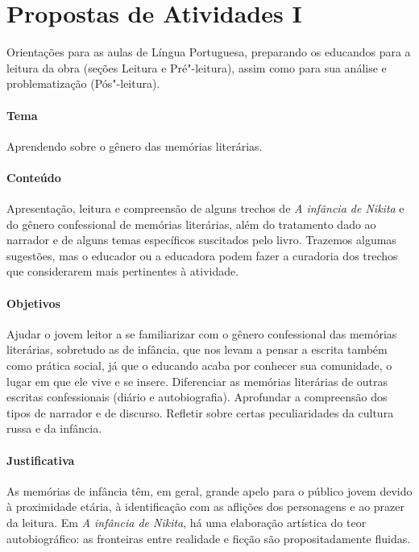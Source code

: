 \documentclass[11pt]{extarticle}
\begin{document}
\tableofcontents

\section{Propostas de Atividades I}

Orientações para as aulas de Língua Portuguesa, preparando os
educandos para a leitura da obra (seções Leitura e Pré"-leitura), assim como para
sua análise e problematização (Pós"-leitura).

\paragraph{Tema} Aprendendo sobre o gênero das memórias literárias.

\paragraph{Conteúdo}
Apresentação, leitura e compreensão de alguns trechos de \emph{A
infância de Nikita} e do gênero confessional de memórias literárias,
além do tratamento dado ao narrador e de alguns temas específicos
suscitados pelo livro. Trazemos algumas sugestões, mas o educador ou a
educadora podem fazer a curadoria dos trechos que considerarem mais
pertinentes à atividade.

\paragraph{Objetivos}
Ajudar o jovem leitor a se familiarizar com o gênero confessional das
memórias literárias, sobretudo as de infância, que nos levam a pensar a
escrita também como prática social, já que o educando acaba por conhecer
sua comunidade, o lugar em que ele vive e se insere. Diferenciar as
memórias literárias de outras escritas confessionais (diário e
autobiografia). Aprofundar a compreensão dos tipos de narrador e de
discurso. Refletir sobre certas peculiaridades da cultura russa e da
infância.

\paragraph{Justificativa}
As memórias de infância têm, em geral, grande apelo para o público jovem
devido à proximidade etária, à identificação com as aflições dos
personagens e ao prazer da leitura. Em \emph{A infância de Nikita}, há
uma elaboração artística do teor autobiográfico: as fronteiras entre
realidade e ficção são propositadamente fluidas.
\end{document}
